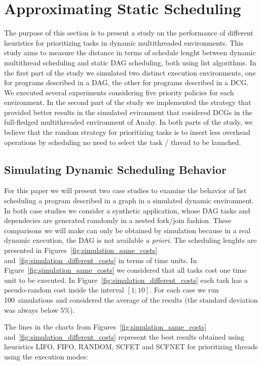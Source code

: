 \documentclass[twocolumn]{svjour3}
\begin{document}
\section{Approximating Static Scheduling} \label{sec:practical_results}

The purpose of this section is to present a study on the performance of different heuristics for prioritizing tasks in dynamic multithreaded environments. This study aims to measure the distance in terms of schedule lenght between dynamic multithread scheduling and static DAG scheduling, both using list algorithms. In the first part of the study we simulated two distinct execution environments, one for programs described in a DAG, the other for programs described in a DCG. We executed several experiments considering five priority policies for each environment. In the second part of the study we implemented the strategy that provided better results in the simulated evironment that cosidered DCGs in the full-fledged multithreaded environment of Anahy. In both parts of the study, we believe that the random strategy for prioritizing tasks is to insert less overhead operations by scheduling no need to select the task / thread to be launched.

\subsection{Simulating Dynamic Scheduling Behavior}

For this paper we will present two case studies to examine the behavior of list scheduling a program described in a graph in a simulated dynamic environment. In both case studies we consider a synthetic application, whose DAG tasks and dependecies are generated ramdomly in a nested fork/join fashion. These comparisons we will make can only be obtained by simulation because in a real dynamic execution, the DAG is not available \emph{a priori}. The scheduling lenghts are presented in Figures~\ref{fig:simulation_same_costs} and~\ref{fig:simulation_different_costs} in terms of time units. In Figure~\ref{fig:simulation_same_costs} we considered that all tasks cost one time unit to be executed. In Figure~\ref{fig:simulation_different_costs} each task has a pseudo-random cost inside the interval $[1;10]$. For each case we run 100~simulations and considered the average of the results (the standard deviation was always below 5\%).

The lines in the charts from Figures~\ref{fig:simulation_same_costs} and~\ref{fig:simulation_different_costs} represent the best results obtained using heuristics LIFO, FIFO, RANDOM, SCFET and SCFNET for prioritizing threads using the execution modes:
\end{document}
